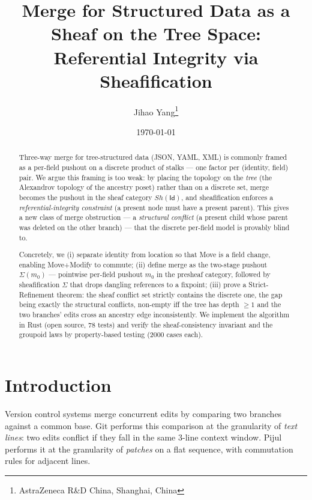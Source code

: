 \documentclass[11pt,a4paper]{article}
\title{Merge for Structured Data as a Sheaf on the Tree Space:\\
Referential Integrity via Sheafification}
\author{
Jihao Yang\thanks{AstraZeneca R\&D China, Shanghai, China}
}
\date{\today}
\newcommand{\Id}{\mathsf{Id}}
\begin{document}
\maketitle

\begin{abstract}
Three-way merge for tree-structured data (JSON, YAML, XML) is commonly framed
as a per-field pushout on a discrete product of stalks --- one factor per
(identity, field) pair. We argue this framing is too weak: by placing the
topology on the \emph{tree} (the Alexandrov topology of the ancestry poset)
rather than on a discrete set, merge becomes the pushout in the sheaf category
$Sh(\Id)$, and sheafification enforces a \emph{referential-integrity
constraint} (a present node must have a present parent). This gives a new class
of merge obstruction --- a \emph{structural conflict} (a present child whose
parent was deleted on the other branch) --- that the discrete per-field model
is provably blind to.

Concretely, we (i) separate identity from location so that Move is a field
change, enabling Move+Modify to commute; (ii) define merge as the two-stage
pushout $\Sigma(m_0)$ --- pointwise per-field pushout $m_0$ in the presheaf
category, followed by sheafification $\Sigma$ that drops dangling references to
a fixpoint; (iii) prove a Strict-Refinement theorem: the sheaf conflict set
strictly contains the discrete one, the gap being exactly the structural
conflicts, non-empty iff the tree has depth $\geq 1$ and the two branches'
edits cross an ancestry edge inconsistently. We implement the algorithm in
Rust (open source, 78 tests) and verify the sheaf-consistency invariant and
the groupoid laws by property-based testing (2000 cases each).
\end{abstract}


\section{Introduction}

Version control systems merge concurrent edits by comparing two branches
against a common base. Git performs this comparison at the granularity of
\emph{text lines}: two edits conflict if they fall in the same 3-line
context window. Pijul performs it at the granularity of \emph{patches}
on a flat sequence, with commutation rules for adjacent lines.
\end{document}
